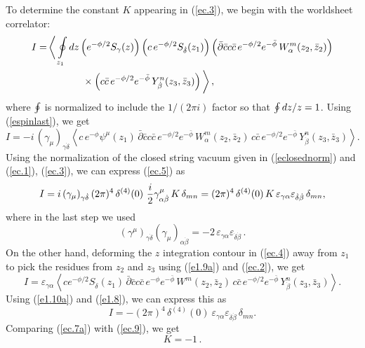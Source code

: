 \documentclass[12pt,a4paper]{article}
\newcommand{\be}{\begin{equation}}
\newcommand{\ee}{\end{equation}}
\newcommand{\refb}[1]{(\ref{#1})}
\newcommand{\p}{\partial}
\def\({\left(}
\def\){\right)}
\newcommand{\ve}{\varepsilon}
\newcommand{\bc}{\bar c}
\def\bz{\bar z}
\def\dbeta{{\dot\beta}}
\def\ddelta{{\dot\delta}}
\begin{document}
To determine the constant $K$ appearing in \refb{ec.3}, we begin with the worldsheet
correlator:
\be
\label{ec.4}
\begin{split}
I =&\, \bigg\langle
\ointop_{z_1} {dz} \(e^{-\phi/2} S_\gamma(z)\)  \(c\, e^{-\phi/2} S_\ddelta(z_1)\)
\(\bar\p \bc c\bc\, e^{-\phi/2} e^{-\bar\phi}\, W^{m}_\alpha(z_2,\bz_2)\)
\\
& \hskip 0.5in
\times \(c\bc\, e^{-\phi/2} e^{-\bar\phi} \,Y^n_\dbeta(z_3,\bz_3)\)
\bigg\rangle \, ,
\end{split}
\ee
where $\ointop$ is normalized to include the $1/(2\pi i)$ factor so that
$\ointop dz/z=1$.
Using \refb{espinlast}, we get
\be\label{ec.5}
I = - i\, (\gamma_\mu)_{\gamma\ddelta}
\left\langle
 c \,e^{-\phi} \psi^\mu(z_1) \,
\bar\p \bc c\bc\, e^{-\phi/2} e^{-\bar\phi}\, W^{m}_\alpha(z_2,\bz_2)\,
c\bc\, e^{-\phi/2} e^{-\bar\phi}\, Y^n_\dbeta(z_3,\bz_3)
\right\rangle.
\ee
Using the normalization of the closed string vacuum given in \refb{eclosednorm}
and \refb{ec.1}, \refb{ec.3}, we can express \refb{ec.5} as
\be\label{ec.7a}
I= i\, (\gamma_\mu)_{\gamma\ddelta} \,  (2\pi)^4 \, \delta^{(4)}(0)\
{i\over 2} \gamma^\mu_{\alpha\dbeta} \, K\,  \delta_{mn}
=   (2\pi)^4 \, \delta^{(4)}(0)\, K\, \ve_{\gamma\alpha} \ve_{\ddelta\dbeta}\, \delta_{mn},
\ee
where in the last step we used
\be
(\gamma^\mu)_{\gamma\ddelta} (\gamma_\mu)_{\alpha\dbeta}
= -2\, \ve_{\gamma\alpha} \ve_{\ddelta\dbeta}\, .
\ee
On the other hand, deforming the $z$ integration contour in \refb{ec.4} away from $z_1$ to pick
the residues from $z_2$ and $z_3$ using \refb{e1.9a} and \refb{ec.2}, we get
\be \label{ec.8}
I=\ve_{\gamma\alpha} \left\langle c e^{-\phi/2} S_\ddelta(z_1)\,
\bar\p \bc c\bc \,e^{-\phi} e^{-\bar\phi}\, W^{m}(z_2,\bz_2)\,
c\bc\, e^{-\phi/2} e^{-\bar\phi}\, Y^n_\dbeta(z_3,\bz_3)
\right\rangle .
\ee
Using \refb{e1.10a} and \refb{e1.8}, we can express this as
\be\label{ec.9}
I=- (2\pi)^4 \, \delta^{(4)}(0)\ \ve_{\gamma\alpha} \ve_{\ddelta\dbeta}\, \delta_{mn}.
\ee
Comparing \refb{ec.7a} with \refb{ec.9}, we get
\be\label{ec.12}
K =-1\, .
\ee
\end{document}
